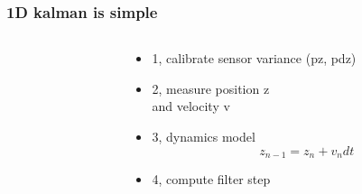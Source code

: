 \documentclass{beamer}
\begin{document}
\begin{frame}
  
  \frametitle{\bf 1D kalman is simple}    

    \begin{columns}

      \begin{column}{0.5\textwidth}
      \end{column}
  
      \begin{column}{0.5\textwidth}
        \begin{itemize}
          \item 1, calibrate sensor variance (pz, pdz)
          \item 2, measure position z \\ and velocity v
          \item 3, dynamics model $$z_{n-1} = z_{n} + v_{n}dt$$
          \item 4, compute filter step
        \end{itemize}
      \end{column}
  
    \end{columns}

\end{frame}
\end{document}
